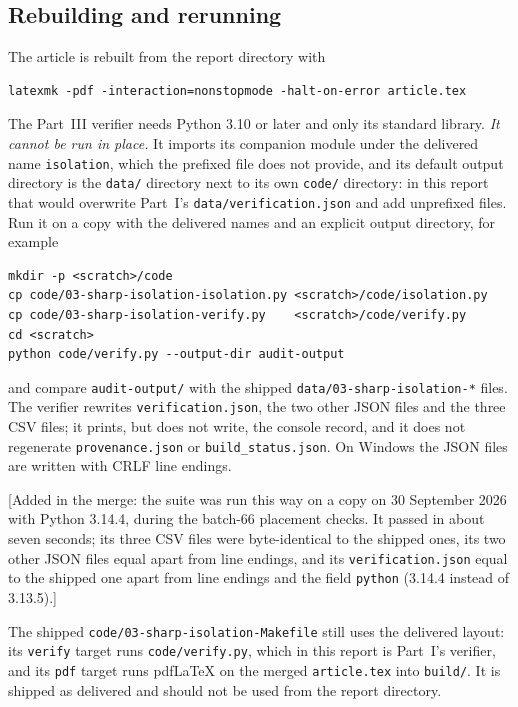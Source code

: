 \documentclass[11pt,letterpaper]{article}
\theoremstyle{definition}\newtheorem{definition}[theorem]{Definition}
\theoremstyle{remark}\newtheorem{remark}[theorem]{Remark}
\theoremstyle{definition}\newtheorem{question}[theorem]{Question}
\begin{document}
\subsection{Rebuilding and rerunning}\label{ids:si:sec:rerun}
The article is rebuilt from the report directory with
\begin{lstlisting}
latexmk -pdf -interaction=nonstopmode -halt-on-error article.tex
\end{lstlisting}
The Part~III verifier needs Python 3.10 or later and only its standard
library. \emph{It cannot be run in place.} It imports its companion module
under the delivered name \texttt{isolation}, which the prefixed file does not
provide, and its default output directory is the \texttt{data/} directory next
to its own \texttt{code/} directory: in this report that would overwrite
Part~I's \texttt{data/verification.json} and add unprefixed files. Run it on a
copy with the delivered names and an explicit output directory, for example
\begin{lstlisting}
mkdir -p <scratch>/code
cp code/03-sharp-isolation-isolation.py <scratch>/code/isolation.py
cp code/03-sharp-isolation-verify.py    <scratch>/code/verify.py
cd <scratch>
python code/verify.py --output-dir audit-output
\end{lstlisting}
and compare \texttt{audit-output/} with the shipped
\nolinkurl{data/03-sharp-isolation-*} files. The verifier rewrites
\texttt{verification.json}, the two other JSON files and the three CSV files;
it prints, but does not write, the console record, and it does not regenerate
\texttt{provenance.json} or \texttt{build\_status.json}. On Windows the JSON
files are written with CRLF line endings.

[Added in the merge: the suite was run this way on a copy on 30 September 2026
with Python 3.14.4, during the batch-66 placement checks. It passed in about
seven seconds; its three CSV files were byte-identical to the shipped ones,
its two other JSON files equal apart from line endings, and its
\texttt{verification.json} equal to the shipped one apart from line endings
and the field \texttt{python} (3.14.4 instead of 3.13.5).]

The shipped \nolinkurl{code/03-sharp-isolation-Makefile} still uses the
delivered layout: its \texttt{verify} target runs \texttt{code/verify.py},
which in this report is Part~I's verifier, and its \texttt{pdf} target runs
pdfLaTeX on the merged \texttt{article.tex} into \texttt{build/}. It is shipped
as delivered and should not be used from the report directory.
\end{document}

